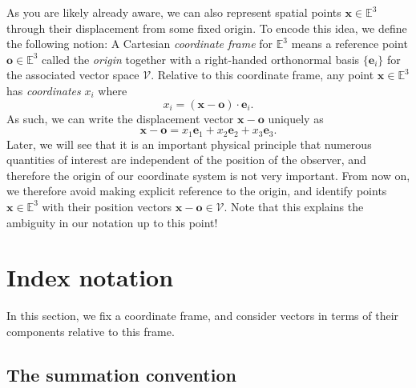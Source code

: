 \documentclass[
  letterpaper,
  DIV=11,
  numbers=noendperiod]{scrreprt}
\theoremstyle{plain}
\theoremstyle{remark}
\begin{document}
As you are likely already aware, we can also represent spatial points
\({\boldsymbol{x}}\in{\mathbb{E}}^3\) through their displacement from
some fixed origin. To encode this idea, we define the following notion:
A Cartesian \emph{coordinate frame} for \({\mathbb{E}}^3\) means a
reference point \({\boldsymbol{o}}\in{\mathbb{E}}^3\) called the
\emph{origin} together with a right-handed orthonormal basis
\(\{{\boldsymbol{e}}_i\}\) for the associated vector space
\({\mathcal{V}}\). Relative to this coordinate frame, any point
\({\boldsymbol{x}}\in{\mathbb{E}}^3\) has \emph{coordinates} \(x_i\)
where
\[x_i = ({\boldsymbol{x}}-{\boldsymbol{o}})\cdot {\boldsymbol{e}}_i.\]
As such, we can write the displacement vector
\({\boldsymbol{x}}-{\boldsymbol{o}}\) uniquely as
\[{\boldsymbol{x}}-{\boldsymbol{o}}= x_1{\boldsymbol{e}}_1+x_2{\boldsymbol{e}}_2+x_3{\boldsymbol{e}}_3.\]
Later, we will see that it is an important physical principle that
numerous quantities of interest are independent of the position of the
observer, and therefore the origin of our coordinate system is not very
important. From now on, we therefore avoid making explicit reference to
the origin, and identify points \({\boldsymbol{x}}\in{\mathbb{E}}^3\)
with their position vectors
\({\boldsymbol{x}}-{\boldsymbol{o}}\in{\mathcal{V}}\). Note that this
explains the ambiguity in our notation up to this point!

\section{Index notation}\label{index-notation}

In this section, we fix a coordinate frame, and consider vectors in
terms of their components relative to this frame.

\subsection{The summation convention}\label{the-summation-convention}
\end{document}
